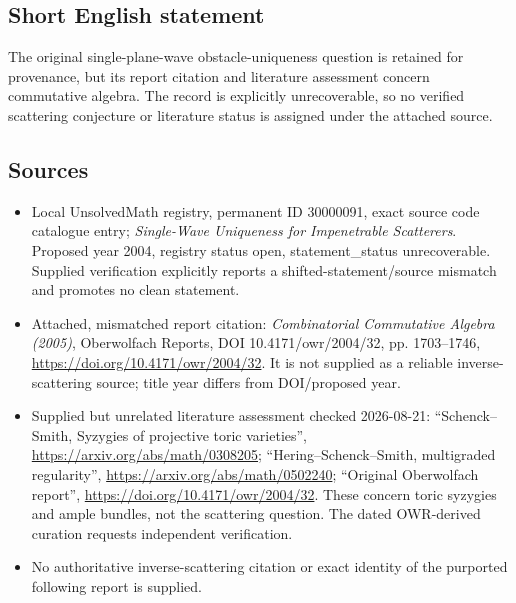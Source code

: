 \documentclass[11pt]{article}
\begin{document}
\subsection{Short English statement}
The original single-plane-wave obstacle-uniqueness question is retained for provenance, but its report citation and literature assessment concern commutative algebra. The record is explicitly unrecoverable, so no verified scattering conjecture or literature status is assigned under the attached source.
\subsection{Sources}
\begin{itemize}
\item Local UnsolvedMath registry, permanent ID 30000091, exact source code catalogue entry; \emph{Single-Wave Uniqueness for Impenetrable Scatterers}. Proposed year 2004, registry status open, statement\_status unrecoverable. Supplied verification explicitly reports a shifted-statement/source mismatch and promotes no clean statement.
\item Attached, mismatched report citation: \emph{Combinatorial Commutative Algebra (2005)}, Oberwolfach Reports, DOI 10.4171/owr/2004/32, pp. 1703--1746, \url{https://doi.org/10.4171/owr/2004/32}. It is not supplied as a reliable inverse-scattering source; title year differs from DOI/proposed year.
\item Supplied but unrelated literature assessment checked 2026-08-21: ``Schenck--Smith, Syzygies of projective toric varieties'', \url{https://arxiv.org/abs/math/0308205}; ``Hering--Schenck--Smith, multigraded regularity'', \url{https://arxiv.org/abs/math/0502240}; ``Original Oberwolfach report'', \url{https://doi.org/10.4171/owr/2004/32}. These concern toric syzygies and ample bundles, not the scattering question. The dated OWR-derived curation requests independent verification.
\item No authoritative inverse-scattering citation or exact identity of the purported following report is supplied.
\end{itemize}
\end{document}
